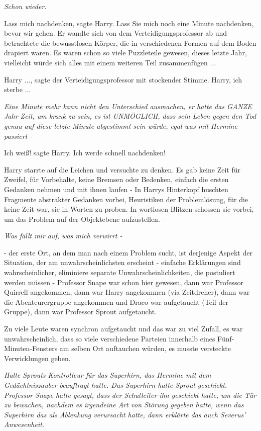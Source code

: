 \emph{Schon wieder.}

\glqq{}Lass mich nachdenken\grqq{}, sagte Harry. \glqq{}Lass Sie mich noch eine
Minute nachdenken, bevor wir gehen.\grqq{} Er wandte sich von dem
Verteidigungsprofessor ab und betrachtete die bewusstlosen Körper, die in
verschiedenen Formen auf dem Boden drapiert waren. Es waren schon so viele
Puzzleteile gewesen, dieses letzte Jahr, vielleicht würde sich alles mit einem
weiteren Teil zusammenfügen ...

\glqq{}Harry ...\grqq{}, sagte der Verteidigungsprofessor mit stockender Stimme.
\glqq{}Harry, ich sterbe ...\grqq{}

\emph{Eine Minute mehr kann nicht den Unterschied ausmachen, er hatte das GANZE
Jahr Zeit, um krank zu sein, es ist UNMÖGLICH, dass sein Leben gegen den Tod
genau auf diese letzte Minute abgestimmt sein würde, egal was mit Hermine
passiert -}

\glqq{}Ich weiß!\grqq{} sagte Harry. \glqq{}Ich werde schnell nachdenken!\grqq{}

Harry starrte auf die Leichen und versuchte zu denken. Es gab keine Zeit für
Zweifel, für Vorbehalte, keine Bremsen oder Bedenken, einfach die ersten
Gedanken nehmen und mit ihnen laufen - In Harrys Hinterkopf huschten Fragmente
abstrakter Gedanken vorbei, Heuristiken der Problemlösung, für die keine Zeit
war, sie in Worten zu proben. In wortlosen Blitzen schossen sie vorbei, um das
Problem auf der Objektebene aufzustellen. -

\emph{Was fällt mir auf, was mich verwirrt -}

- der erste Ort, an dem man nach einem Problem sucht, ist derjenige Aspekt der
Situation, der am unwahrscheinlichsten erscheint - einfache Erklärungen sind
wahrscheinlicher, eliminiere separate Unwahrscheinlichkeiten, die postuliert
werden müssen - Professor Snape war schon hier gewesen, dann war Professor
Quirrell angekommen, dann war Harry angekommen (via Zeitdreher), dann war die
Abenteurergruppe angekommen und Draco war aufgetaucht (Teil der Gruppe), dann
war Professor Sprout aufgetaucht.

Zu viele Leute waren synchron aufgetaucht und das war zu viel Zufall, es war
unwahrscheinlich, dass so viele verschiedene Parteien innerhalb eines
Fünf-Minuten-Fensters am selben Ort auftauchen würden, es musste versteckte
Verwicklungen geben.

\emph{Halte Sprouts Kontrolleur für das Superhirn, das Hermine mit dem
Gedächtniszauber beauftragt hatte. Das Superhirn hatte Sprout geschickt.
Professor Snape hatte gesagt, dass der Schulleiter ihn geschickt hatte, um die
Tür zu bewachen, nachdem es irgendeine Art von Störung gegeben hatte, wenn das
Superhirn das als Ablenkung verursacht hatte, dann erklärte das auch Severus'
Anwesenheit.}

